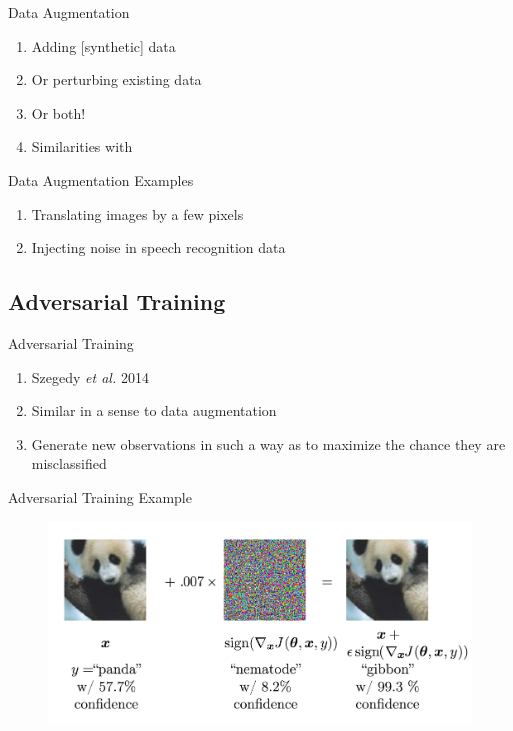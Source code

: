 \documentclass[pdf]{beamer}
\begin{document}
		\begin{frame}{Data Augmentation}
		\begin{enumerate}
			\item Adding [synthetic] data
			\item Or perturbing existing data 
			\item Or both!
			\item Similarities with 
		\end{enumerate}
		\end{frame}

		
		\begin{frame}{Data Augmentation Examples}
		\begin{enumerate}
			\item Translating images by a few pixels 
			\item Injecting noise in speech recognition data
		\end{enumerate}
		\end{frame}
		
	
	\subsection{Adversarial Training}
		
		\begin{frame}{Adversarial Training}
		\begin{enumerate}
			\item Szegedy \textit{et al.} 2014
			\item Similar in a sense to data augmentation
			\item Generate new observations in such a way as to maximize the chance they are misclassified
		\end{enumerate}
		\end{frame}
		
		\begin{frame}{Adversarial Training Example}
			\begin{figure}
				\includegraphics[scale = 0.25]{panda.png}
			\end{figure}		
    		\end{frame}
\end{document}
